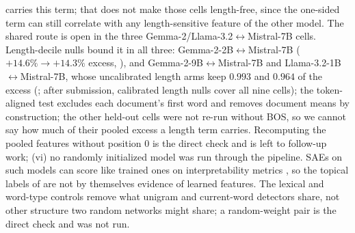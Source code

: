 carries this term; that does not make those cells length-free, since the one-sided term can still
correlate with any length-sensitive feature of the other model. The shared route is open in the
three Gemma-2/Llama-3.2$\leftrightarrow$Mistral-7B cells. Length-decile nulls bound it in all three:
Gemma-2-2B$\leftrightarrow$Mistral-7B ($+14.6\%\to+14.3\%$ excess, ), and
Gemma-2-9B$\leftrightarrow$Mistral-7B and Llama-3.2-1B$\leftrightarrow$Mistral-7B, whose uncalibrated length arms keep
$0.993$ and $0.964$ of the excess (; after submission, calibrated length nulls cover all nine cells); the
token-aligned test excludes each document's first word and removes document means by construction;
the other held-out cells were not re-run without BOS, so we cannot say how much of their pooled excess
a length term carries. Recomputing the pooled features without position $0$ is the
direct check and is left to follow-up work;
(vi) no randomly initialized model was run through the pipeline. SAEs on such models can score
like trained ones on interpretability metrics \citep{heap2025random}, so the topical labels of
 are not by themselves evidence of learned features. The lexical and
word-type controls remove what unigram and current-word detectors share, not other structure two
random networks might share; a random-weight pair is the direct check and was not run.

